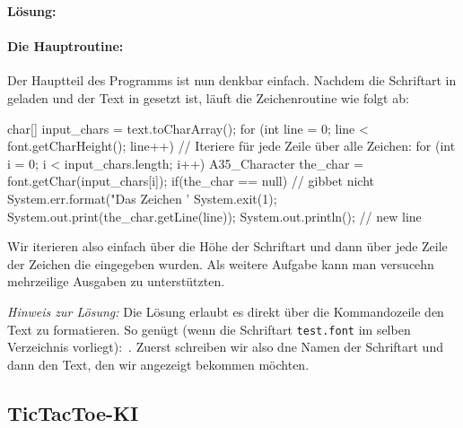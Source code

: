 \documentclass[table]{sopra-base}
\makeatletter
\let\T\texttt
\newenvironment{solution}{\null\par\noindent\textbf{\textcolor{sob@col@uulm@cs}{Lösung:}}\newline\bgroup\color{black}\slshape\ignorespaces}{\egroup}
\makeatother
\begin{document}
\begin{solution}
\paragraph{Die Hauptroutine:}
Der Hauptteil des Programms ist nun denkbar einfach. Nachdem die Schriftart in  geladen und der Text in  gesetzt ist, läuft die Zeichenroutine wie folgt ab:
{\upshape
\begin{java}[firstnumber=32]
char[] input_chars = text.toCharArray();
for (int line = 0; line < font.getCharHeight(); line++) {
    // Iteriere für jede Zeile über alle Zeichen:
    for (int i = 0; i < input_chars.length; i++) {
        A35_Character the_char = font.getChar(input_chars[i]);
        if(the_char == null) { // gibbet nicht
            System.err.format("Das Zeichen '%
            System.exit(1);
        } 
        System.out.print(the_char.getLine(line));
    }
    System.out.println(); // new line
}
\end{java}
}
    Wir iterieren also einfach über die Höhe der Schriftart und dann über jede Zeile der Zeichen die eingegeben wurden. Als weitere Aufgabe kann man versucehn mehrzeilige Ausgaben zu unterstützten.\par{}
    \textit{Hinweis zur Lösung:} Die Lösung erlaubt es direkt über die Kommandozeile den Text zu formatieren. So genügt (wenn die Schriftart \T{test.font} im selben Verzeichnis vorliegt): \,. Zuerst schreiben wir also dne Namen der Schriftart und dann den Text, den wir angezeigt bekommen möchten.
    \egroup
\end{solution}

\subsection{TicTacToe-KI}
\end{document}
